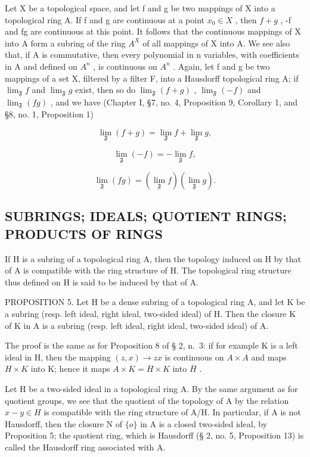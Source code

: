 Let X be a topological space, and let f and g be two mappings of X into a topological ring A. If f and g are continuous at a point \(x_{0} \in X\) , then \(f + g\) , -f and fg are continuous at this point. It follows that the continuous mappings of X into A form a subring of the ring \(A^{X}\) of all mappings of X into A. We see also that, if A is commutative, then every polynomial in n variables, with coefficients in A and defined on \(A^{n}\) , is continuous on \(A^{n}\) . Again, let f and g be two mappings of a set X, filtered by a filter F, into a Hausdorff topological ring A; if \(\lim_{\mathfrak{F}} f\) and \(\lim_{\mathfrak{F}} g\) exist, then so do \(\lim_{\mathfrak{F}} (f + g)\) , \(\lim_{\mathfrak{F}} (-f)\) and \(\lim_{\mathfrak{F}} (fg)\) , and we have (Chapter I, §7, no. 4, Proposition 9, Corollary 1, and §8, no. 1, Proposition 1)

\[
\lim _ {\mathfrak {F}} (f + g) = \lim _ {\mathfrak {F}} f + \lim _ {\mathfrak {F}} g,\tag{1}
\]

\[
\lim _ {\mathfrak {F}} (- f) = - \lim _ {\mathfrak {F}} f,\tag{2}
\]

\[
\lim _ {\mathfrak {F}} (f g) = (\lim _ {\mathfrak {F}} f) (\lim _ {\mathfrak {F}} g).\tag{3}
\]

\subsection{SUBRINGS; IDEALS; QUOTIENT RINGS; PRODUCTS OF RINGS}

If H is a subring of a topological ring A, then the topology induced on H by that of A is compatible with the ring structure of H. The topological ring structure thus defined on H is said to be induced by that of A.

PROPOSITION 5. Let H be a dense subring of a topological ring A, and let K be a subring (resp. left ideal, right ideal, two-sided ideal) of H. Then the closure K of K in A is a subring (resp. left ideal, right ideal, two-sided ideal) of A.

The proof is the same as for Proposition 8 of § 2, n.~3: if for example K is a left ideal in H, then the mapping \((z, x) \to zx\) is continuous on \(A \times A\) and maps \(H \times K\) into K; hence it maps \(A \times K = \overline{H} \times K\) into \(\overline{H}\) .

Let H be a two-sided ideal in a topological ring A. By the same argument as for quotient groups, we see that the quotient of the topology of A by the relation \(x - y \in H\) is compatible with the ring structure of A/H. In particular, if A is not Hausdorff, then the closure N of \(\{o\}\) in A is a closed two-sided ideal, by Proposition 5; the quotient ring, which is Hausdorff (§ 2, no. 5, Proposition 13) is called the Hausdorff ring associated with A.

